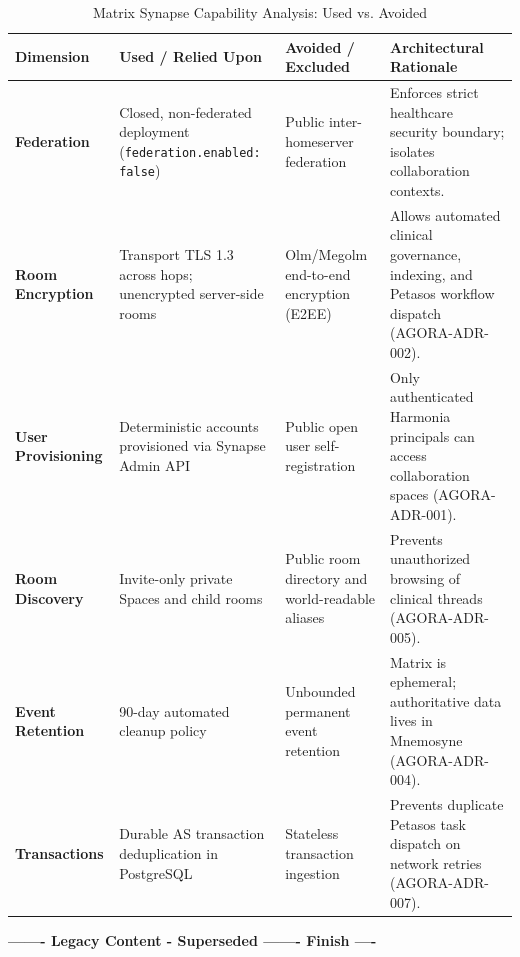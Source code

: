 \begin{table}[htbp]
\centering
\scriptsize
\begin{tabularx}{\textwidth}{P{3.0cm} P{3.8cm} P{3.8cm} Y}
\toprule
\textbf{Dimension} & \textbf{Used / Relied Upon} & \textbf{Avoided / Excluded} & \textbf{Architectural Rationale} \\
\midrule
\textbf{Federation} & Closed, non-federated deployment (\nolinkurl{federation.enabled: false}) & Public inter-homeserver federation & Enforces strict healthcare security boundary; isolates collaboration contexts. \\
\addlinespace
\textbf{Room Encryption} & Transport TLS 1.3 across hops; unencrypted server-side rooms & Olm/Megolm end-to-end encryption (E2EE) & Allows automated clinical governance, indexing, and Petasos workflow dispatch (AGORA-ADR-002). \\
\addlinespace
\textbf{User Provisioning} & Deterministic accounts provisioned via Synapse Admin API & Public open user self-registration & Only authenticated Harmonia principals can access collaboration spaces (AGORA-ADR-001). \\
\addlinespace
\textbf{Room Discovery} & Invite-only private Spaces and child rooms & Public room directory and world-readable aliases & Prevents unauthorized browsing of clinical threads (AGORA-ADR-005). \\
\addlinespace
\textbf{Event Retention} & 90-day automated cleanup policy & Unbounded permanent event retention & Matrix is ephemeral; authoritative data lives in Mnemosyne (AGORA-ADR-004). \\
\addlinespace
\textbf{Transactions} & Durable AS transaction deduplication in PostgreSQL & Stateless transaction ingestion & Prevents duplicate Petasos task dispatch on network retries (AGORA-ADR-007). \\
\bottomrule
\end{tabularx}
\caption{Matrix Synapse Capability Analysis: Used vs. Avoided}
\label{tab:synapse_used_vs_avoided}
\end{table}

\newpage

\par\noindent\textbf{------- Legacy Content - Superseded ------- Finish ----}
